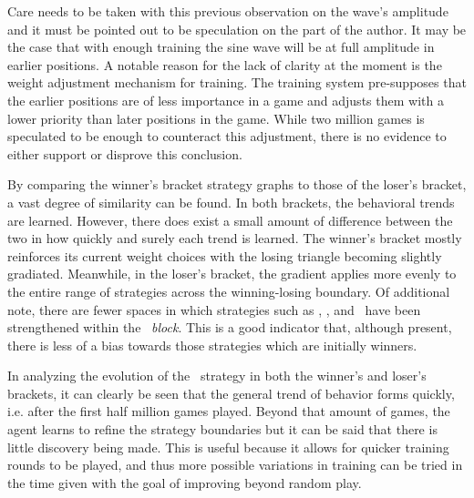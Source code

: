 Care needs to be taken with this previous observation on the wave's amplitude
and it must be pointed out to be speculation on the part of the author.
%
It may be the case that with enough training the sine wave will be at full
amplitude in earlier positions.
%
A notable reason for the lack of clarity at the moment is the weight adjustment
mechanism for training.
%
The training system pre-supposes that the earlier positions are of less
importance in a game and adjusts them with a lower priority than later positions
in the game.
%
While two million games is speculated to be enough to counteract this
adjustment,
there is no evidence to either support or disprove this conclusion.





By comparing the winner's bracket strategy graphs to those of the loser's
bracket,
a vast degree of similarity can be found.
%
In both brackets,
the behavioral trends are learned.
%
However,
there does exist a small amount of difference between the two
in how quickly and surely each trend is learned.
%
The winner's bracket mostly reinforces its current weight choices
with the losing triangle becoming slightly gradiated.
Meanwhile,
in the loser's bracket,
the gradient applies more evenly to the entire range of strategies
across the winning-losing boundary.
%
Of additional note,
there are fewer spaces in which
strategies such as \cribminavg, \peggingmaxavggained, and \peggingminavggiven\ 
have been strengthened within the \handmaxmin\ \textit{block}.
%
This is a good indicator that,
although present,
there is less of a bias towards those strategies which are initially winners.




In analyzing the evolution of the \handmaxavg\ strategy in both the winner's
and loser's brackets,
it can clearly be seen that the general trend of behavior forms
quickly,
i.e. after the first half million games played.
%
Beyond that amount of games,
the agent learns to refine the strategy boundaries
but it can be said that there is little discovery being made.
%
This is useful because it allows for quicker training rounds to be played,
and thus more possible variations in training can be tried in the time given
with the goal of improving beyond random play.










